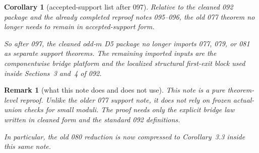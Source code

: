\documentclass[11pt]{article}
\newtheorem{corollary}[theorem]{Corollary}
\newtheorem{remark}[theorem]{Remark}
\begin{document}
\begin{corollary}[accepted-support list after 097]
Relative to the cleaned 092 package and the already completed reproof notes
095--096, the old 077 theorem no longer needs to remain in accepted-support
form.

So after 097, the cleaned odd-$m$ D5 package no longer imports 077, 079, or
081 as separate support theorems. The remaining imported inputs are the
componentwise bridge platform and the localized structural first-exit block
used inside Sections~3 and~4 of 092.
\end{corollary}

\begin{remark}[what this note does and does not use]
This note is a pure theorem-level reproof. Unlike the older 077 support note,
it does \emph{not} rely on frozen actual-union checks for small moduli. The
proof needs only the explicit bridge law written in cleaned form and the
standard 092 definitions.

In particular, the old 080 reduction is now compressed to Corollary~3.3 inside
this same note.
\end{remark}
\end{document}
